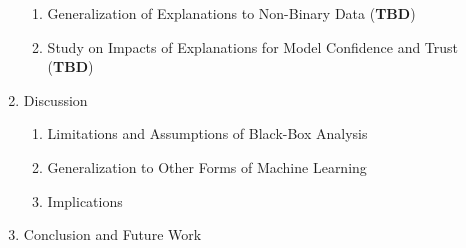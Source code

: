 \begin{enumerate}[label*=\arabic*.]
\begin{enumerate}[label*=\arabic*.]
        \item Generalization of Explanations to Non-Binary Data (\textbf{TBD})
        \item Study on Impacts of Explanations for Model Confidence and Trust (\textbf{TBD})
    \end{enumerate}
    \item Discussion
    \begin{enumerate}[label*=\arabic*.]
        \item Limitations and Assumptions of Black-Box Analysis
        \item Generalization to Other Forms of Machine Learning
        \item Implications
    \end{enumerate}
    \item Conclusion and Future Work
\end{enumerate}
\newpage
